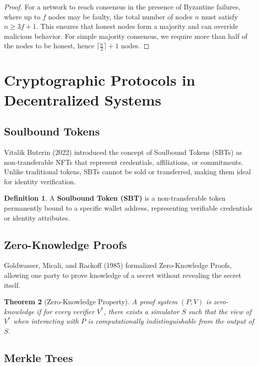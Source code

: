 \documentclass[12pt]{report}
\theoremstyle{plain}
\newtheorem{theorem}{Theorem}[section]
\theoremstyle{definition}
\newtheorem{definition}[theorem]{Definition}
\theoremstyle{remark}
\begin{document}
\begin{proof}
For a network to reach consensus in the presence of Byzantine failures, where up to $f$ nodes may be faulty, the total number of nodes $n$ must satisfy $n \geq 3f + 1$. This ensures that honest nodes form a majority and can override malicious behavior. For simple majority consensus, we require more than half of the nodes to be honest, hence $\lceil \frac{n}{2} \rceil + 1$ nodes.
\end{proof}

\section{Cryptographic Protocols in Decentralized Systems}

\subsection{Soulbound Tokens}

Vitalik Buterin (2022) introduced the concept of Soulbound Tokens (SBTs) as non-transferable NFTs that represent credentials, affiliations, or commitments. Unlike traditional tokens, SBTs cannot be sold or transferred, making them ideal for identity verification.

\begin{definition}
A \textbf{Soulbound Token (SBT)} is a non-transferable token permanently bound to a specific wallet address, representing verifiable credentials or identity attributes.
\end{definition}

\subsection{Zero-Knowledge Proofs}

Goldwasser, Micali, and Rackoff (1985) formalized Zero-Knowledge Proofs, allowing one party to prove knowledge of a secret without revealing the secret itself.

\begin{theorem}[Zero-Knowledge Property]
A proof system $(P, V)$ is zero-knowledge if for every verifier $V^*$, there exists a simulator $S$ such that the view of $V^*$ when interacting with $P$ is computationally indistinguishable from the output of $S$.
\end{theorem}

\subsection{Merkle Trees}
\end{document}
